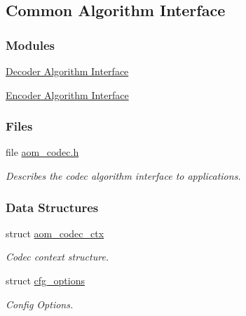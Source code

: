 \hypertarget{group__codec}{}\subsection{Common Algorithm Interface}
\label{group__codec}
\subsubsection*{Modules}
\begin{DoxyCompactItemize}
\item 
\hyperlink{group__decoder}{Decoder Algorithm Interface}
\item 
\hyperlink{group__encoder}{Encoder Algorithm Interface}
\end{DoxyCompactItemize}
\subsubsection*{Files}
\begin{DoxyCompactItemize}
\item 
file \hyperlink{aom__codec_8h}{aom\+\_\+codec.\+h}
\begin{DoxyCompactList}\small\item\em Describes the codec algorithm interface to applications. \end{DoxyCompactList}\end{DoxyCompactItemize}
\subsubsection*{Data Structures}
\begin{DoxyCompactItemize}
\item 
struct \hyperlink{structaom__codec__ctx}{aom\+\_\+codec\+\_\+ctx}
\begin{DoxyCompactList}\small\item\em Codec context structure. \end{DoxyCompactList}\item 
struct \hyperlink{structcfg__options}{cfg\+\_\+options}
\begin{DoxyCompactList}\small\item\em Config Options. \end{DoxyCompactList}\end{DoxyCompactItemize}
